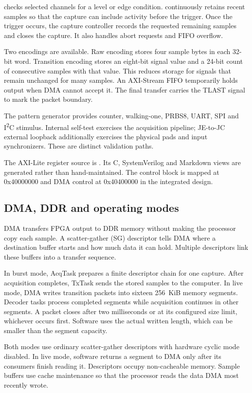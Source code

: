 \documentclass[11pt,a4paper]{article}
\newcommand{\code}[1]{\texttt{\detokenize{#1}}}
\newcommand{\iu}{I\textsuperscript{2}C}
\begin{document}
\code{la_trigger} checks selected channels for a level or edge condition.
\code{la_pretrig_ring} continuously retains recent samples so that the capture
can include activity before the trigger. Once the trigger occurs, the capture
controller records the requested remaining samples and closes the capture.
It also handles abort requests and FIFO overflow.

Two encodings are available. Raw encoding stores four sample bytes in each
32-bit word. Transition encoding stores an eight-bit signal value and a 24-bit
count of consecutive samples with that value. This reduces storage for signals
that remain unchanged for many samples. An AXI-Stream FIFO temporarily holds
output when DMA cannot accept it. The final transfer carries the TLAST signal
to mark the packet boundary.

The pattern generator provides counter, walking-one, PRBS8, UART, SPI and \iu{}
stimulus. Internal self-test exercises the acquisition pipeline; JE-to-JC
external loopback additionally exercises the physical pads and input
synchronizers. These are distinct validation paths.

The AXI-Lite register source is . Its C, SystemVerilog and
Markdown views are generated rather than hand-maintained. The control block is
mapped at 0x40000000 and DMA control at 0x40400000 in the integrated design.

\subsection{DMA, DDR and operating modes}

DMA transfers FPGA output to DDR memory without making the processor copy each
sample. A scatter-gather (SG) descriptor tells DMA where a destination buffer
starts and how much data it can hold. Multiple descriptors link these buffers
into a transfer sequence.

In burst mode, AcqTask prepares a finite descriptor chain for one capture.
After acquisition completes, TxTask sends the stored samples to the computer.
In live mode, DMA writes transition packets into sixteen 256~KiB memory segments.
Decoder tasks process completed segments while acquisition continues in other
segments. A packet closes after two milliseconds or at its configured size limit,
whichever occurs first. Software uses the actual written length, which can be
smaller than the segment capacity.

Both modes use ordinary scatter-gather descriptors with hardware cyclic mode
disabled. In live mode, software returns a segment to DMA only after its
consumers finish reading it. Descriptors occupy non-cacheable memory. Sample
buffers use cache maintenance so that the processor reads the data DMA most
recently wrote.
\end{document}
